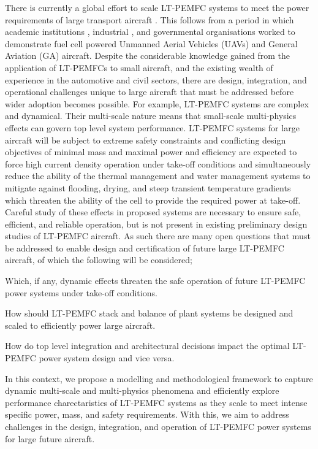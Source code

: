 There is currently a global effort to scale LT-PEMFC systems to meet the power requirements of large transport aircraft \cite{weeksZeroAviaReceivesFAA2025, retallackCommercialAircraftManufacturer2023, NEWBORNNExtGeneration, woodScalabilityHydrogenFuel}.
This follows from a period in which academic institutions \cite{kalloFuelCellSystems2013}, industrial \cite{lapena-reyFirstFuelCellManned2010}, and governmental organisations \cite{noll2004investigation} worked to demonstrate fuel cell powered Unmanned Aerial Vehicles (UAVs) and General Aviation (GA) aircraft.
Despite the considerable knowledge gained from the application of LT-PEMFCs to small aircraft, and the existing wealth of experience in the automotive and civil sectors, there are  design, integration, and operational challenges unique to large aircraft that must be addressed before wider adoption becomes possible.
For example, LT-PEMFC systems are complex and dynamical.
Their multi-scale nature means that small-scale multi-physics effects can govern top level system performance.
LT-PEMFC systems for large aircraft will be subject to extreme safety constraints and conflicting design objectives of minimal mass and maximal power and efficiency are expected to force high current density operation under take-off conditions and simultaneously reduce the ability of the thermal management and water management systems to mitigate against flooding, drying, and steep transient temperature gradients which threaten the ability of the cell to provide the required power at take-off. Careful study of these effects in proposed systems are necessary to ensure safe, efficient, and reliable operation, but is not present in existing preliminary design studies of LT-PEMFC aircraft.
As such there are many open questions that must be addressed to enable design and certification of future large LT-PEMFC aircraft, of which the following will be considered; \begin{enumerate*}
	\item Which, if any, dynamic effects threaten the safe operation of future LT-PEMFC power systems under take-off conditions.
	\item How should LT-PEMFC stack and balance of plant systems be designed and scaled to efficiently power large aircraft.
	\item How do top level integration and architectural decisions impact the optimal LT-PEMFC power system design and vice versa.
\end{enumerate*}

In this context, we propose a modelling and methodological framework to capture dynamic multi-scale and multi-physics phenomena and efficiently explore performance charectaristics of LT-PEMFC systems as they scale to meet intense specific power, mass, and safety requirements.
With this, we aim to address challenges in the design, integration, and operation of LT-PEMFC power systems for large future aircraft.

